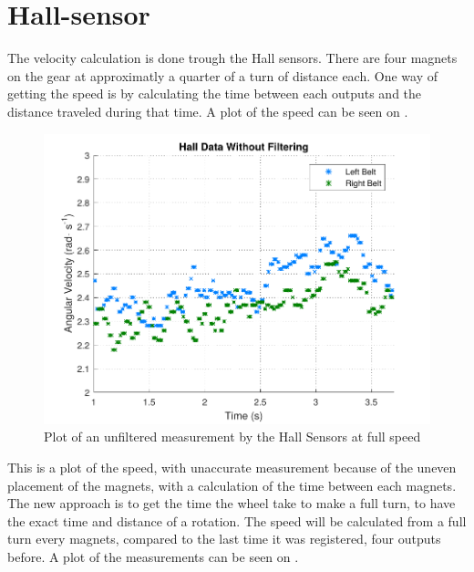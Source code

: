 \section{Hall-sensor}

The velocity calculation is done trough the Hall sensors. There are four magnets on the gear at approximatly a quarter of a turn of distance each. One way of getting the speed is by calculating the time between each outputs and the distance traveled during that time. A plot of the speed can be seen on .

\begin{figure}[H]
	\centering
	\includegraphics[scale=0.9]{figures/unfilteredHall.pdf}
	\caption{Plot of an unfiltered measurement by the Hall Sensors at full speed}
	\label{unfilteredHall}
\end{figure}


This is a plot of the speed, with unaccurate measurement because of the uneven placement of the magnets, with a calculation of the time between each magnets.\\


The new approach is to get the time the wheel take to make a full turn, to have the exact time and distance of a rotation. The speed will be calculated from a full turn every magnets, compared to the last time it was registered, four outputs before. A plot of the measurements can be seen on .

